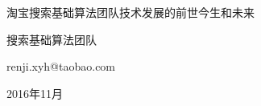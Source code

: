  \vspace*{0.0cm}
\thispagestyle{empty}
\vspace*{2.2cm}
\centerline{\hei{\color{darkblue}{第一版前言}}}\vspace{2cm}

淘宝搜索基础算法团队技术发展的前世今生和未来

\vspace{1cm}

\hfill 搜索基础算法团队 \hspace{0.2em}

\hfill renji.xyh@taobao.com \hspace{0.2em}

\hfill 2016年11月\hspace{0.2em}
